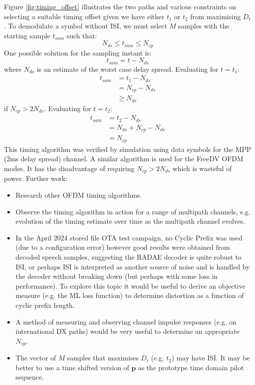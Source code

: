 \documentclass{article}
\begin{document}
Figure \ref{fig:timing_offset} illustrates the two paths and various constraints on selecting a suitable timing offset given we have either $t_1$ or $t_2$ from maximising $D_t$. To demodulate a symbol without ISI, we must select $M$ samples with the starting sample $t_{sam}$ such that:
\begin{equation}
N_{ds} \le t_{sam} \le N_{cp}
\end{equation}
One possible solution for the sampling instant is:
\begin{equation}
t_{sam} = t - N_{ds}
\end{equation}
where $N_{ds}$ is an estimate of the worst case delay spread.  Evaluating for $t=t_1$:
\begin{equation} 
\begin{split}
t_{sam} &= t_1 - N_{ds} \\
        &= N_{cp} - N_{ds} \\
        &\ge N_{ds}\
\end{split}
\end{equation}
if $N_{cp} > 2N_{ds}$. Evaluating for $t=t_2$:
\begin{equation} 
\begin{split}
 t_{sam} &= t_2 - N_{ds} \\
         &= N_{ds} + N_{cp} - N_{ds} \\
         &= N_{cp}
\end{split}
\end{equation}
This timing algorithm was verified by simulation using data symbols for the MPP (2ms delay spread) channel.  A similar algorithm is used for the FreeDV OFDM modes. It has the disadvantage of requiring $N_{cp}>2N_{ds}$ which is wasteful of power. Further work:
\begin{itemize}
\item Research other OFDM timing algorithms.
\item Observe the timing algorithm in action for a range of multipath channels, e.g. evolution of the timing estimate over time as the multipath channel evolves.
\item In the April 2024 stored file OTA test campaign, no Cyclic Prefix was used (due to a configuration error) however good results were obtained from decoded speech samples, suggesting the RADAE decoder is quite robust to ISI, or perhaps ISI is interpreted as another source of noise and is handled by the decoder without breaking down (but perhaps with some loss in performance). To explore this topic it would be useful to derive an objective measure (e.g. the ML loss function) to determine distortion as a function of cyclic prefix length.
\item A method of measuring and observing channel impulse responses (e.g. on international DX paths) would be very useful to determine an appropriate $N_{cp}$.
\item The vector of $M$ samples that maximises $D_t$ (e.g. $t_2$) may have ISI.  It may be better to use a time shifted version of $\bm{p}$ as the prototype time domain pilot sequence.
\end{itemize} 
\end{document}
